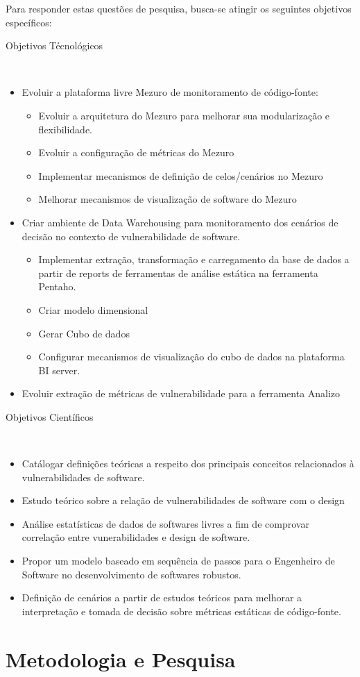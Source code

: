 %

Para responder estas questões de pesquisa, busca-se atingir os seguintes objetivos específicos:

%
\begin{description}
	\item [Objetivos Técnológicos]\
\end{description}
		\begin{itemize}
			\item Evoluir a plataforma livre Mezuro de monitoramento de código-fonte:
				\begin{itemize}
					\item Evoluir a arquitetura do Mezuro para melhorar sua modularização e flexibilidade.
					\item Evoluir a configuração de métricas do Mezuro
					\item Implementar mecanismos de definição de celos/cenários no Mezuro
					\item Melhorar mecanismos de visualização de software do Mezuro
				\end{itemize}
			\item Criar ambiente de Data Warehousing para monitoramento dos cenários de decisão no contexto de vulnerabilidade de software.	
	        	\begin{itemize}
	        		\item Implementar extração, transformação e carregamento da base de dados a partir de reports de ferramentas de análise estática na ferramenta Pentaho.
	        		\item Criar modelo dimensional
	        		\item Gerar Cubo de dados        
					\item Configurar mecanismos de visualização do cubo de dados na plataforma BI server.
	        	\end{itemize}
			\item Evoluir extração de métricas de vulnerabilidade para a ferramenta Analizo
		\end{itemize}
\begin{description}
	\item [Objetivos Científicos]\
\end{description}	
	 	\begin{itemize}
			\item Catálogar definições teóricas a respeito dos principais conceitos relacionados à vulnerabilidades de software.
			\item Estudo teórico sobre a relação de vulnerabilidades de software com o design
			\item Análise estatísticas de dados de softwares livres a fim de comprovar correlação entre vunerabilidades e design de software.
			\item Propor um modelo baseado em sequência de passos para o Engenheiro de Software no desenvolvimento de softwares robustos.
			\item Definição de cenários a partir de estudos teóricos para melhorar a interpretação e tomada de decisão sobre métricas estáticas de código-fonte.
	 	\end{itemize}






\section{Metodologia e Pesquisa}
